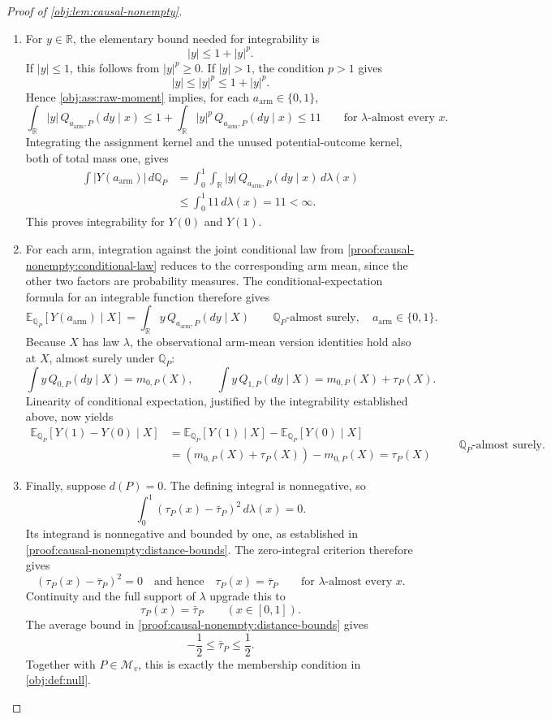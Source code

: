 \documentclass[11pt]{article}
\begin{document}
\begin{proof}[Proof of \cref{obj:lem:causal-nonempty}]
\begin{enumerate}
\item For \(y\in\mathbb R\), the elementary bound needed for integrability is
\[
|y|\le1+|y|^p.
\]
If \(|y|\le1\), this follows from \(|y|^p\ge0\). If \(|y|>1\), the condition \(p>1\) gives
\[
|y|\le|y|^p\le1+|y|^p.
\]
Hence \cref{obj:ass:raw-moment} implies, for each
\(a_{\mathrm{arm}}\in\{0,1\}\),
\[
\int_{\mathbb R}|y|\,Q_{a_{\mathrm{arm}},P}(dy\mid x)
\le1+\int_{\mathbb R}|y|^p\,Q_{a_{\mathrm{arm}},P}(dy\mid x)
\le11
\qquad\text{for \(\lambda\)-almost every }x.
\]
Integrating the assignment kernel and the unused potential-outcome kernel, both of total mass one, gives
\[
\begin{aligned}
\int |Y(a_{\mathrm{arm}})|\,d\mathbb Q_P
&=\int_0^1\int_{\mathbb R}
 |y|\,Q_{a_{\mathrm{arm}},P}(dy\mid x)\,d\lambda(x)\\
&\le\int_0^1 11\,d\lambda(x)=11<\infty.
\end{aligned}
\]
This proves integrability for \(Y(0)\) and \(Y(1)\).

\item For each arm, integration against the joint conditional law from \cref{proof:causal-nonempty:conditional-law} reduces to the corresponding arm mean, since the other two factors are probability measures. The conditional-expectation formula for an integrable function therefore gives
\[
\mathbb E_{\mathbb Q_P}[Y(a_{\mathrm{arm}})\mid X]
=\int_{\mathbb R}y\,Q_{a_{\mathrm{arm}},P}(dy\mid X)
\qquad\mathbb Q_P\text{-almost surely},
\quad a_{\mathrm{arm}}\in\{0,1\}.
\]
Because \(X\) has law \(\lambda\), the observational arm-mean version identities hold also at \(X\), almost surely under \(\mathbb Q_P\):
\[
\int y\,Q_{0,P}(dy\mid X)=m_{0,P}(X),
\qquad
\int y\,Q_{1,P}(dy\mid X)=m_{0,P}(X)+\tau_P(X).
\]
Linearity of conditional expectation, justified by the integrability established above, now yields
\[
\begin{aligned}
\mathbb E_{\mathbb Q_P}[Y(1)-Y(0)\mid X]
&=\mathbb E_{\mathbb Q_P}[Y(1)\mid X]
 -\mathbb E_{\mathbb Q_P}[Y(0)\mid X]\\
&=(m_{0,P}(X)+\tau_P(X))-m_{0,P}(X)
=\tau_P(X)
\end{aligned}
\qquad\mathbb Q_P\text{-almost surely}.
\]

\item Finally, suppose \(d(P)=0\). The defining integral is nonnegative, so
\[
\int_0^1(\tau_P(x)-\bar\tau_P)^2\,d\lambda(x)=0.
\]
Its integrand is nonnegative and bounded by one, as established in \cref{proof:causal-nonempty:distance-bounds}. The zero-integral criterion therefore gives
\[
(\tau_P(x)-\bar\tau_P)^2=0
\quad\text{and hence}\quad
\tau_P(x)=\bar\tau_P
\qquad\text{for \(\lambda\)-almost every }x.
\]
Continuity and the full support of \(\lambda\) upgrade this to
\[
\tau_P(x)=\bar\tau_P
\qquad(x\in[0,1]).
\]
The average bound in \cref{proof:causal-nonempty:distance-bounds} gives
\[
-\frac12\le\bar\tau_P\le\frac12.
\]
Together with \(P\in\mathcal M_v\), this is exactly the membership condition in \cref{obj:def:null}.


\end{enumerate}
\end{proof}
\end{document}
